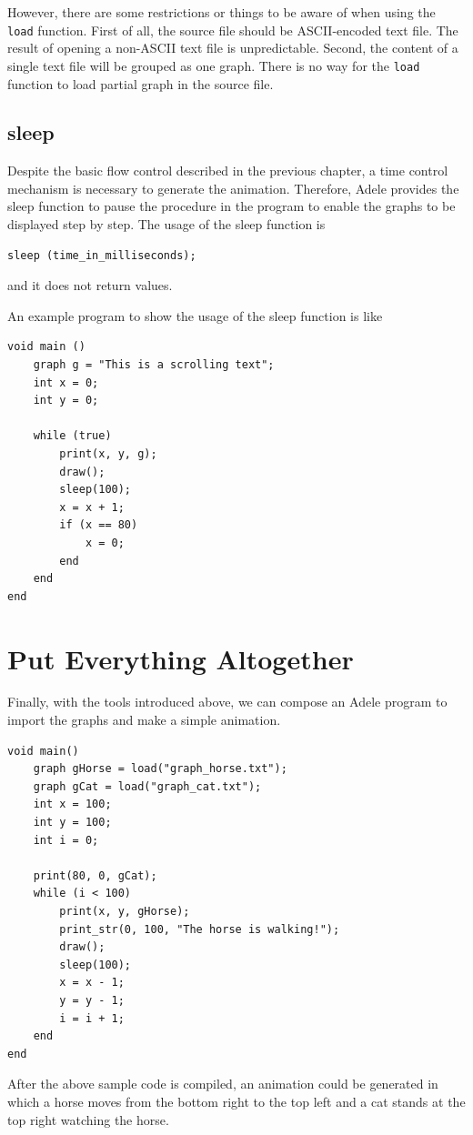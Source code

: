 \documentclass[11pt,letterpaper]{article}
\begin{document}
However, there are some restrictions or things to be aware of when using the \texttt{load} function. First of all, the source file should be ASCII-encoded text file. The result of opening a non-ASCII text file is unpredictable. Second, the content of a single text file will be grouped as one graph. There is no way for the \texttt{load} function to load partial graph in the source file.

\subsection {sleep}

Despite the basic flow control described in the previous chapter, a time control mechanism is necessary to generate the animation. Therefore, Adele provides the sleep function to pause the procedure in the program to enable the graphs to be displayed step by step. The usage of the sleep function is
\begin{lstlisting}[tabsize=4]
	sleep (time_in_milliseconds);
\end{lstlisting}
and it does not return values.

An example program to show the usage of the sleep function is like

\begin{lstlisting}[caption=marquee.adele, label=marquee, captionpos=b, tabsize=4, frame=single]
void main ()
	graph g = "This is a scrolling text";
	int x = 0;
	int y = 0;
		
	while (true)
		print(x, y, g);
		draw();
		sleep(100);
		x = x + 1;
		if (x == 80)
			x = 0;
		end
	end
end
\end{lstlisting}

\section {Put Everything Altogether}
Finally, with the tools introduced above, we can compose an Adele program to import the graphs and make a simple animation.
\pagebreak
\begin{lstlisting}[caption=simple\_anima.adele, label=animation, captionpos=b, tabsize=4, frame=single]
void main()
	graph gHorse = load("graph_horse.txt");
	graph gCat = load("graph_cat.txt");
	int x = 100;
	int y = 100;
	int i = 0;

	print(80, 0, gCat);
	while (i < 100)
		print(x, y, gHorse);
		print_str(0, 100, "The horse is walking!");
		draw();
		sleep(100);
		x = x - 1;
		y = y - 1;
		i = i + 1;
	end
end
\end{lstlisting}

After the above sample code is compiled, an animation could be generated in which a horse moves from the bottom right to the top left and a cat stands at the top right watching the horse.
\end{document}
